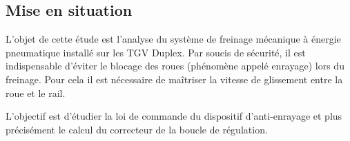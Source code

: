 \documentclass[10pt,fleqn]{article} %
\begin{document}

\vspace{4.5cm}
\pagestyle{fancy}
\thispagestyle{plain}


\def\columnseprulecolor{\color{ocre}}
\setlength{\columnseprule}{0.4pt} 

\ifprof

\else
\begin{multicols}{2}
\fi
\section*{Mise en situation}

L’objet de cette étude est l’analyse du système de freinage mécanique à énergie
pneumatique installé sur les TGV Duplex. Par soucis de sécurité, il est indispensable d'éviter le blocage des roues (phénomène appelé enrayage) lors du freinage. Pour cela il est nécessaire de maîtriser la vitesse de glissement entre la roue et le rail.
\begin{obj}
L’objectif est d'étudier la loi de commande du dispositif d’anti-enrayage et plus précisément le calcul du correcteur de la boucle de régulation.
\end{obj}





\end{multicols}
\end{document}
